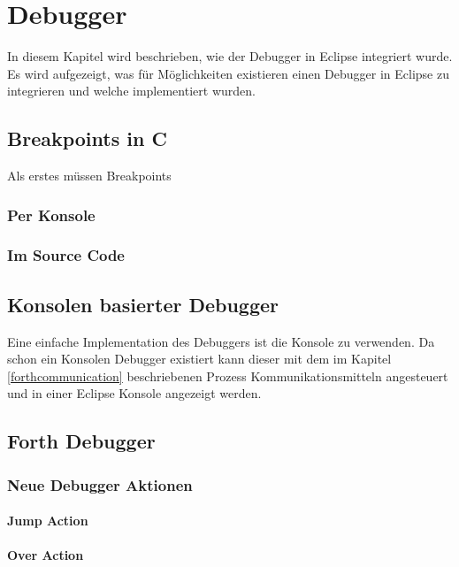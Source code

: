 \chapter{Debugger}

In diesem Kapitel wird beschrieben, wie der Debugger in Eclipse integriert wurde. Es wird aufgezeigt, was für Möglichkeiten existieren einen Debugger in Eclipse zu integrieren und welche implementiert wurden.

\section{Breakpoints in C}
Als erstes müssen Breakpoints

\subsection{Per Konsole}

\subsection{Im Source Code}


\section{Konsolen basierter Debugger}

Eine einfache Implementation des Debuggers ist die Konsole zu verwenden. Da schon ein Konsolen Debugger existiert kann dieser mit dem im Kapitel \ref{forthcommunication} beschriebenen Prozess Kommunikationsmitteln angesteuert und in einer Eclipse Konsole angezeigt werden.

\section{Forth Debugger}

\subsection{Neue Debugger Aktionen}

\subsubsection{Jump Action}

\subsubsection{Over Action}

